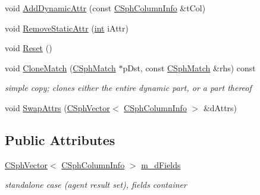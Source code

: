 \begin{DoxyCompactItemize}
void \hyperlink{classCSphRsetSchema_a2de791838650501e4771e74cb66eb860}{Add\-Dynamic\-Attr} (const \hyperlink{structCSphColumnInfo}{C\-Sph\-Column\-Info} \&t\-Col)
\item 
void \hyperlink{classCSphRsetSchema_ae85ee414cc877885d91ad644fc4d98c6}{Remove\-Static\-Attr} (\hyperlink{sphinxexpr_8cpp_a4a26e8f9cb8b736e0c4cbf4d16de985e}{int} i\-Attr)
\item 
void \hyperlink{classCSphRsetSchema_ab91db2b4d750f12f5a9107eab1faa07d}{Reset} ()
\item 
void \hyperlink{classCSphRsetSchema_a0d7cff46d8957f3458dc99a29306ebeb}{Clone\-Match} (\hyperlink{classCSphMatch}{C\-Sph\-Match} $\ast$p\-Dst, const \hyperlink{classCSphMatch}{C\-Sph\-Match} \&rhs) const 
\begin{DoxyCompactList}\small\item\em simple copy; clones either the entire dynamic part, or a part thereof \end{DoxyCompactList}\item 
void \hyperlink{classCSphRsetSchema_af680ce5d98f488ab61a22ad649057af7}{Swap\-Attrs} (\hyperlink{classCSphVector}{C\-Sph\-Vector}$<$ \hyperlink{structCSphColumnInfo}{C\-Sph\-Column\-Info} $>$ \&d\-Attrs)
\end{DoxyCompactItemize}
\subsection*{Public Attributes}
\begin{DoxyCompactItemize}
\item 
\hyperlink{classCSphVector}{C\-Sph\-Vector}$<$ \hyperlink{structCSphColumnInfo}{C\-Sph\-Column\-Info} $>$ \hyperlink{classCSphRsetSchema_a562e907b9c4509062bf950f4ef1cf1a8}{m\-\_\-d\-Fields}
\begin{DoxyCompactList}\small\item\em standalone case (agent result set), fields container \end{DoxyCompactList}\end{DoxyCompactItemize}
